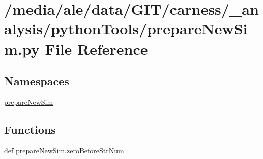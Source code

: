 \hypertarget{a00063}{\section{/media/ale/data/\-G\-I\-T/carness/\-\_\-analysis/python\-Tools/prepare\-New\-Sim.py File Reference}
\label{a00063}
}
\subsection*{Namespaces}
\begin{DoxyCompactItemize}
\item 
\hyperlink{a00124}{prepare\-New\-Sim}
\end{DoxyCompactItemize}
\subsection*{Functions}
\begin{DoxyCompactItemize}
\item 
def \hyperlink{a00124_a6b14bf9916da5f148ec52646dd61250d}{prepare\-New\-Sim.\-zero\-Before\-Str\-Num}
\end{DoxyCompactItemize}
